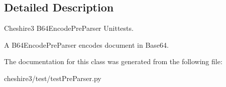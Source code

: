 \subsection{Detailed Description}
\begin{DoxyVerb}Cheshire3 B64EncodePreParser Unittests.

A B64EncodePreParser encodes document in Base64.\end{DoxyVerb}
 

The documentation for this class was generated from the following file\-:\begin{DoxyCompactItemize}
\item 
cheshire3/test/test\-Pre\-Parser.\-py\end{DoxyCompactItemize}
